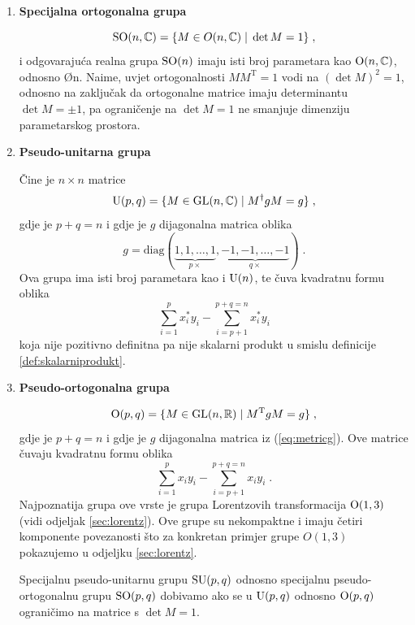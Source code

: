 \begin{enumerate}[leftmargin=0pt, itemindent=0pt]
\item \textbf{Specijalna ortogonalna grupa}

\begin{equation}
\mathrm{SO}(n, \mathbb{C}) = \{ M\in O(n, \mathbb{C}) \; | \; \det M  = 1\} \;,
\end{equation}
i odgovarajuća realna grupa $\mathrm{SO}(n)$ imaju isti broj parametara kao
$\mathrm{O}(n, \mathbb{C})$, odnosno \O{n}. Naime, uvjet ortogonalnosti
$M M^{\mathrm{T}} = 1$ vodi na $(\det M)^2 = 1$, odnosno
na zaključak da ortogonalne matrice imaju determinantu $\det M = \pm 1$,
pa ograničenje na $\det M = 1$ ne smanjuje dimenziju parametarskog prostora.

\item \textbf{Pseudo-unitarna grupa}

Čine je $n\times n$ matrice
\begin{equation}
\mathrm{U}(p, q) = \{ M\in \mathrm{GL}(n,\mathbb{C}) \; | \; M^{\dagger} g M = g\} \;,
\end{equation}
gdje je $p+q=n$ i gdje je $g$ dijagonalna matrica oblika
\begin{equation}
  g = \mathrm{diag}(\underbrace{1, 1, \dots, 1}_{p \times},
\underbrace{-1, -1, \dots, -1}_{q \times}) \;.
\label{eq:metricg}
\end{equation}
Ova grupa ima isti broj parametara kao i $\mathrm{U}(n)$, te
čuva kvadratnu formu oblika
\begin{equation}
 \sum_{i=1}^{p} x_{i}^* y_{i} - \sum_{i=p+1}^{p+q=n} x_{i}^* y_i 
\end{equation}
koja nije pozitivno definitna pa nije skalarni produkt u smislu
definicije \ref{def:skalarniprodukt}.


\item \textbf{Pseudo-ortogonalna grupa}

\begin{equation}
\mathrm{O}(p, q) = \{ M\in \mathrm{GL}(n,\mathbb{R}) \; | \; M^{\mathrm{T}} g M = g \} \;,
\label{eq:MgM}
\end{equation}
gdje je $p+q=n$ i gdje je $g$ dijagonalna matrica iz (\ref{eq:metricg}).
Ove matrice čuvaju kvadratnu formu oblika
\begin{equation}
 \sum_{i=1}^{p} x_{i} y_{i} - \sum_{i=p+1}^{p+q=n} x_{i} y_i  \;.
\end{equation}
Najpoznatija grupa ove vrste je grupa Lorentzovih transformacija  $\mathrm{O}(1,3)$
(vidi odjeljak \ref{sec:lorentz}). Ove grupe su nekompaktne i imaju
četiri komponente povezanosti što za 
konkretan primjer grupe $O(1,3)$ pokazujemo u odjeljku \ref{sec:lorentz}.

Specijalnu pseudo-unitarnu grupu $\mathrm{SU}(p,q)$ odnosno specijalnu
pseudo-or\-to\-go\-nal\-nu
grupu $\mathrm{SO}(p,q)$ dobivamo ako se u $\mathrm{U}(p,q)$ odnosno $\mathrm{O}(p, q)$
ograničimo na matrice s $\det M = 1$.

\end{enumerate}



